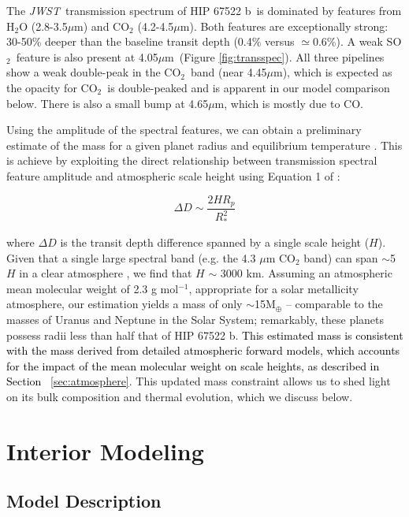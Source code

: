 \documentclass[twocolumn]{aastex63} %
\newcommand{\um}{$\mu$m}
\newcommand{\jwst}{\textit{JWST}}
\newcommand{\cotwo}{CO$_2$}
\newcommand{\sotwo}{SO$_2$}
\newcommand{\plname}{HIP 67522 b}
\newcommand{\newedit}[1]{\textcolor{black}{#1}}
\begin{document}
The \jwst\ transmission spectrum of \plname\ is dominated by features from H$_2$O (2.8-3.5\um) and CO$_2$ (4.2-4.5\um). Both features are exceptionally strong: 30-50\% deeper than the baseline transit depth (0.4\% versus $\simeq0.6$\%). A weak \sotwo\ feature is also present at 4.05\um\ (Figure \ref{fig:transspec}). All three pipelines show a weak double-peak in the \cotwo\ band (near 4.45\um), which is expected as the opacity for \cotwo\ is double-peaked and is apparent in our model comparison below. There is also a small bump at 4.65\um, which is mostly due to CO. 


Using the amplitude of the spectral features, we can obtain a preliminary estimate of the mass for a given planet radius and equilibrium temperature \citep{de_wit_constraining_2013}. This is achieve by exploiting the direct relationship between transmission spectral feature amplitude and atmospheric scale height using Equation 1 of \citet{stevenson2016}: 

\begin{equation}
    \Delta D \sim \frac{2HR_p}{R_*^2}
\end{equation}

\noindent where $\Delta D$ is the transit depth difference spanned by a single scale height ($H$). Given that a single large spectral band (e.g. the 4.3 $\mu$m CO$_2$ band) can span $\sim$5$H$ in a clear atmosphere \citep{Seager2000}, we find that $H$ $\sim$ 3000 km. Assuming an atmospheric mean molecular weight of 2.3 g mol$^{-1}$, appropriate for a solar metallicity atmosphere, our estimation yields a mass of only $\sim$15M$_{\oplus}$ -- comparable to the masses of Uranus and Neptune in the Solar System; remarkably, these planets possess radii less than half that of \plname. \newedit{This estimated mass is consistent with the mass derived from detailed atmospheric forward models, which accounts for the impact of the mean molecular weight on scale heights, as described in Section ~\ref{sec:atmosphere}}. This updated mass constraint allows us to shed light on its bulk composition and thermal evolution, which we discuss below. 

\section{Interior Modeling}\label{sec:interior}

\subsection{Model Description}
\end{document}
